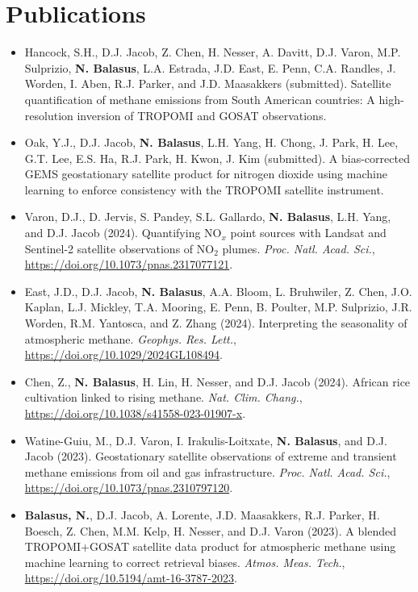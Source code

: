 \documentclass[10pt]{article}
\begin{document}
\section*{Publications}
\begin{itemize}
    \itemsep0em
    \item Hancock, S.H., D.J. Jacob, Z. Chen, H. Nesser, A. Davitt, D.J. Varon, M.P. Sulprizio, \textbf{N. Balasus}, L.A. Estrada, J.D. East, E. Penn, C.A. Randles, J. Worden, I. Aben, R.J. Parker, and J.D. Maasakkers (submitted). Satellite quantification of methane emissions from South American countries: A high-resolution inversion of TROPOMI and GOSAT observations.
    \item Oak, Y.J., D.J. Jacob, \textbf{N. Balasus}, L.H. Yang, H. Chong, J. Park, H. Lee, G.T. Lee, E.S. Ha, R.J. Park, H. Kwon, J. Kim (submitted). A bias-corrected GEMS geostationary satellite product for nitrogen dioxide using machine learning to enforce consistency with the TROPOMI satellite instrument.
    \item Varon, D.J., D. Jervis, S. Pandey, S.L. Gallardo, \textbf{N. Balasus}, L.H. Yang, and D.J. Jacob (2024). Quantifying NO$_x$ point sources with Landsat and Sentinel-2 satellite observations of NO$_2$ plumes. \textit{Proc. Natl. Acad. Sci.}, \href{https://doi.org/10.1073/pnas.2317077121}{https://doi.org/10.1073/pnas.2317077121}.
    \item East, J.D., D.J. Jacob, \textbf{N. Balasus}, A.A. Bloom, L. Bruhwiler, Z. Chen, J.O. Kaplan, L.J. Mickley, T.A. Mooring, E. Penn, B. Poulter, M.P. Sulprizio, J.R. Worden, R.M. Yantosca, and Z. Zhang (2024). Interpreting the seasonality of atmospheric methane. \textit{Geophys. Res. Lett.}, \href{https://doi.org/10.1029/2024GL108494}{https://doi.org/10.1029/2024GL108494}.
    \item Chen, Z., \textbf{N. Balasus}, H. Lin, H. Nesser, and D.J. Jacob (2024). African rice cultivation linked to rising methane. \textit{Nat. Clim. Chang.}, \href{https://doi.org/10.1038/s41558-023-01907-x}{https://doi.org/10.1038/s41558-023-01907-x}.
    \item Watine-Guiu, M., D.J. Varon, I. Irakulis-Loitxate, \textbf{N. Balasus}, and D.J. Jacob (2023). Geostationary satellite observations of extreme and transient methane emissions from oil and gas infrastructure. \textit{Proc. Natl. Acad. Sci.}, \href{https://doi.org/10.1073/pnas.2310797120}{https://doi.org/10.1073/pnas.2310797120}.
    \item \textbf{Balasus, N.}, D.J. Jacob, A. Lorente, J.D. Maasakkers, R.J. Parker, H. Boesch, Z. Chen, M.M. Kelp, H. Nesser, and D.J. Varon (2023). A blended TROPOMI+GOSAT satellite data product for atmospheric methane using machine learning to correct retrieval biases. \textit{Atmos. Meas. Tech.}, \href{https://doi.org/10.5194/amt-16-3787-2023}{https://doi.org/10.5194/amt-16-3787-2023}.

\end{itemize}
\end{document}
